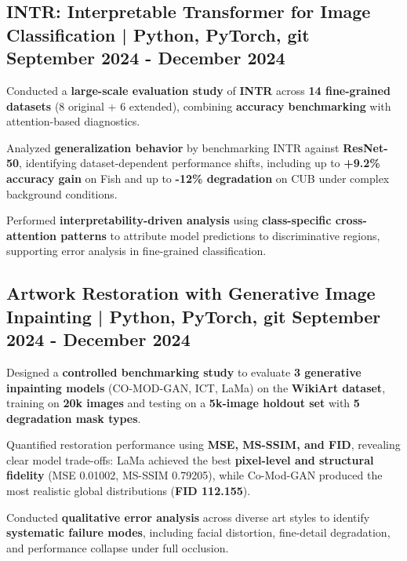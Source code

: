 


\subsection{{INTR: Interpretable Transformer for Image Classification | Python, PyTorch, git  \hfill September 2024 - December 2024}}
\begin{zitemize}
    \item Conducted a \textbf{large-scale evaluation study} of \textbf{INTR} across \textbf{14 fine-grained datasets} (8 original + 6 extended), combining \textbf{accuracy benchmarking} with attention-based diagnostics.

    \item Analyzed \textbf{generalization behavior} by benchmarking INTR against \textbf{ResNet-50}, identifying dataset-dependent performance shifts, including up to \textbf{+9.2\% accuracy gain} on Fish and up to \textbf{-12\% degradation} on CUB under complex background conditions.

    \item Performed \textbf{interpretability-driven analysis} using \textbf{class-specific cross-attention patterns} to attribute model predictions to discriminative regions, supporting error analysis in fine-grained classification.

\end{zitemize}


\subsection{{Artwork Restoration with Generative Image Inpainting | Python, PyTorch, git  \hfill September 2024 - December 2024}}
\begin{zitemize}
    \item Designed a \textbf{controlled benchmarking study} to evaluate \textbf{3 generative inpainting models} (CO-MOD-GAN, ICT, LaMa) on the \textbf{WikiArt dataset}, training on \textbf{20k images} and testing on a \textbf{5k-image holdout set} with \textbf{5 degradation mask types}.

    \item Quantified restoration performance using \textbf{MSE, MS-SSIM, and FID}, revealing clear model trade-offs: LaMa achieved the best \textbf{pixel-level and structural fidelity} (MSE 0.01002, MS-SSIM 0.79205), while Co-Mod-GAN produced the most realistic global distributions (\textbf{FID 112.155}).

    \item Conducted \textbf{qualitative error analysis} across diverse art styles to identify \textbf{systematic failure modes}, including facial distortion, fine-detail degradation, and performance collapse under full occlusion.
\end{zitemize}





